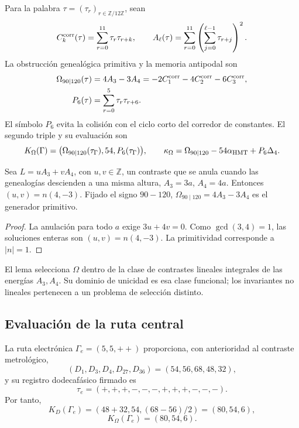 Para la palabra \(\tau=(\tau_r)_{r\in\mathbb Z/12\mathbb Z}\), sean
\[
 C_k^{\rm corr}(\tau)=\sum_{r=0}^{11}\tau_r\tau_{r+k},
 \qquad
 A_\ell(\tau)=\sum_{r=0}^{11}
 \left(\sum_{j=0}^{\ell-1}\tau_{r+j}\right)^2.
\]
La obstrucción genealógica primitiva y la memoria antipodal son
\begin{align}
 \Omega_{90\mid120}(\tau)
 &=4A_3-3A_4
 =-2C_1^{\rm corr}-4C_2^{\rm corr}-6C_3^{\rm corr},
 \label{eq:omega-two-way-rev11}\\
 P_6(\tau)&=\sum_{r=0}^{5}\tau_r\tau_{r+6}.
 \label{eq:p6-two-way-rev11}
\end{align}
El símbolo \(P_6\) evita la colisión con el ciclo corto del corredor de
constantes. El segundo triple y su evaluación son
\begin{equation}
 K_\Omega(\Gamma)=\bigl(\Omega_{90\mid120}(\tau_\Gamma),54,
 P_6(\tau_\Gamma)\bigr),
 \qquad
 \kappa_\Omega=\Omega_{90\mid120}-54\alpha_{\rm HMT}+P_6\Delta_4.
 \label{eq:kappa-omega-rev11}
\end{equation}

\begin{lemma}
\label{lem:unicidad-omega-rev11}
Sea \(L=uA_3+vA_4\), con \(u,v\in\mathbb Z\), un contraste que se anula
cuando las genealogías descienden a una misma altura,
\(A_3=3a\), \(A_4=4a\). Entonces
\((u,v)=n(4,-3)\). Fijado el signo \(90-120\),
\(\Omega_{90\mid120}=4A_3-3A_4\) es el generador primitivo.
\end{lemma}

\begin{proof}
La anulación para todo \(a\) exige \(3u+4v=0\). Como
\(\gcd(3,4)=1\), las soluciones enteras son
\((u,v)=n(4,-3)\). La primitividad corresponde a \(|n|=1\).
\end{proof}

El lema selecciona \(\Omega\) dentro de la clase de contrastes lineales
integrales de las energías \(A_3,A_4\). Su dominio de unicidad es esa clase
funcional; los invariantes no lineales pertenecen a un problema de selección
distinto.

\subsection{Evaluación de la ruta central}

La ruta electrónica \(\Gamma_e=(5,5,++)\) proporciona, con anterioridad al
contraste metrológico,
\[
 (D_1,D_3,D_4,D_{27},D_{36})=(54,56,68,48,32),
\]
y su registro dodecafásico firmado es
\[
 \tau_e=(+,+,+,-,-,-,+,+,+,-,-,-).
\]
Por tanto,
\[
 K_D(\Gamma_e)=(48+32,54,(68-56)/2)=(80,54,6),
\]
\[
 K_\Omega(\Gamma_e)=(80,54,6).
\]

